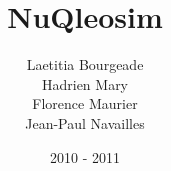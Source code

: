 \documentclass[a4paper, 12pt]{report}
\title{NuQleosim}  %
\date{2010 - 2011}  %
\author{Laetitia Bourgeade \\ Hadrien Mary \\ Florence Maurier \\ Jean-Paul Navailles}
\begin{document}
\maketitle  %
\newpage
\thispagestyle{empty}
\tableofcontents  %
\thispagestyle{empty}
\newpage{}
\thispagestyle{fancy}









\appendix
\appendixpage
\addappheadtotoc
\renewcommand{\thesection}{\Alph{section}.}


\nocite{*}
\label{sec:bibli}
\end{document}
